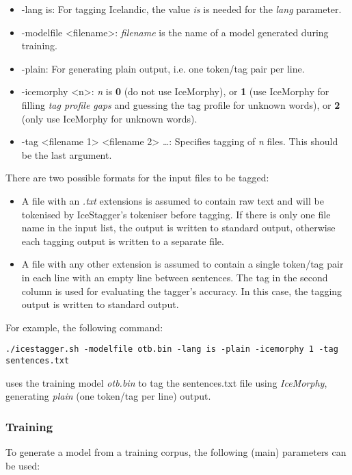 \documentclass[11pt]{article}
\begin{document}
\begin{itemize} 
\item -lang is: For tagging Icelandic, the value \emph{is} is needed for the \emph{lang} parameter.
\item -modelfile <filename>: \emph{filename} is the name of a model generated during training.
\item -plain: For generating plain output, i.e. one token/tag pair per line.
\item -icemorphy <n>: \emph{n} is {\bf 0} (do not use IceMorphy), or {\bf 1} (use IceMorphy for filling \emph{tag profile gaps} and guessing the tag profile for unknown words), or {\bf 2} (only use IceMorphy for unknown words).
\item -tag <filename 1> <filename 2> \ldots <filename n>: Specifies tagging of \emph{n} files. This should be the last argument.  
\end{itemize}

There are two possible formats for the input files to be tagged:
\begin{itemize}
\item  A file with an \emph{.txt} extensions is assumed to contain raw text and will be tokenised by IceStagger's tokeniser before tagging.  If there is only one file name in the input list, the output is written to standard output, otherwise each tagging output is written to a separate file.
\item A file with any other extension is assumed to contain a single token/tag pair in each line with an empty line between sentences.  The tag in the second column is used for evaluating the tagger's accuracy. In this case, the tagging output is written to standard output.
\end{itemize}
  
For example, the following command:

\begin{verbatim}
./icestagger.sh -modelfile otb.bin -lang is -plain -icemorphy 1 -tag sentences.txt
\end{verbatim}

uses the training model \emph{otb.bin} to tag the sentences.txt file using \emph{IceMorphy}, generating \emph{plain} (one token/tag per line) output.

\subsubsection{Training}
To generate a model from a training corpus, the following (main) parameters can be used:
\end{document}
